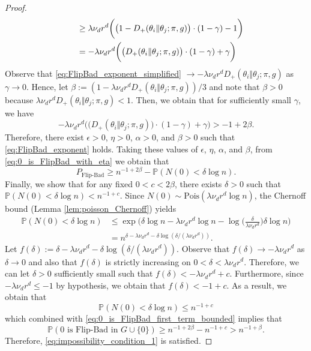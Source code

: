 \documentclass{article}
\renewcommand{\P}{\mathbb{P}}
\newcommand{\1}{\mathbbm{1}}
\theoremstyle{definition}
\theoremstyle{plain}
\begin{document}
\begin{proof}
\begin{align}
        &\quad\geq \lambda \nu_d r^d \bigg( \big(1 - D_+(\theta_i \Vert \theta_j; \pi, g)\big) \cdot (1 - \gamma) - 1 \bigg) \notag \\
        &\quad= -\lambda \nu_d r^d \bigg( \big(D_+(\theta_i \Vert \theta_j; \pi, g)\big) \cdot (1 - \gamma) + \gamma \bigg)
    \end{align}
    Observe that \eqref{eq:FlipBad_exponent_simplified} $\to -\lambda \nu_d r^d D_+(\theta_i \Vert \theta_j; \pi, g)$  as $\gamma \to 0$. Hence, let $\beta := (1 - \lambda \nu_d r^d D_+(\theta_i \Vert \theta_j; \pi, g)) / 3$ and note that $\beta > 0$ because $\lambda \nu_d r^d D_+(\theta_i \Vert \theta_j; \pi, g) < 1$. Then, we obtain that for sufficiently small $\gamma$, we have
    \begin{equation*}
        -\lambda \nu_d r^d \bigg( \big(D_+(\theta_i \Vert \theta_j; \pi, g)\big) \cdot (1 - \gamma) + \gamma \bigg) > -1 + 2\beta.
    \end{equation*}
    Therefore, there exist $\epsilon > 0$, $\eta > 0$, $\alpha > 0$, and $\beta > 0$ such that \eqref{eq:FlipBad_exponent} holds. Taking these values of $\epsilon$, $\eta$, $\alpha$, and $\beta$, from \eqref{eq:0_is_FlipBad_with_eta} we obtain that 
    \begin{equation}
    \label{eq:0_is_FlipBad_first_term_bounded}
        P_\text{Flip-Bad} \geq n^{-1 + 2\beta} - \P(N(0) < \delta \log n).
    \end{equation}
    Finally, we show that for any fixed $0 < c < 2\beta$, there exists $\delta > 0$ such that $\P(N(0) < \delta \log n) < n^{-1 + c}$. Since $N(0) \sim \text{Pois}(\lambda \nu_d r^d \log n)$, the Chernoff bound (Lemma \ref{lem:poisson_Chernoff}) yields
    \begin{align*}
        \P(N(0) < \delta \log n) &\leq \exp\bigg(\delta \log n - \lambda \nu_d r^d \log n - \log\Big(\frac{\delta}{\lambda \nu_d r^d}\Big) \delta \log n\bigg) \\
        &= n^{\delta - \lambda \nu_d r^d - \delta \log(\delta/(\lambda \nu_d r^d))}.
    \end{align*}
    Let $f(\delta) := \delta - \lambda \nu_d r^d - \delta \log(\delta/(\lambda \nu_d r^d))$. Observe that $f(\delta) \to -\lambda \nu_d r^d$ as $\delta \to 0$ and also that $f(\delta)$ is strictly increasing on $0 < \delta < \lambda \nu_d r^d$. Therefore, we can let $\delta > 0$ sufficiently small such that $f(\delta) < -\lambda \nu_d r^d + c$. Furthermore, since $-\lambda \nu_d r^d \leq -1$ by hypothesis, we obtain that $f(\delta) < -1 + c$. As a result, we obtain that
    \begin{equation*}
        \P(N(0) < \delta \log n) \leq n^{-1 + c}
    \end{equation*}
    which combined with \eqref{eq:0_is_FlipBad_first_term_bounded} implies that
    \begin{equation*}
        \P(0 \text{ is Flip-Bad in } G \cup \{0\}) \geq n^{-1 + 2\beta} - n^{-1 + c} > n^{-1+\beta}.
    \end{equation*}
     Therefore, \eqref{eq:impossibility_condition_1} is satisfied.
\end{proof}
\end{document}
